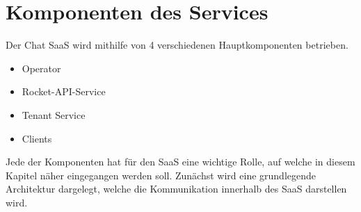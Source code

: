 \chapter{Komponenten des Services}
\label{chap:komponenten}

Der Chat \ac{SaaS} wird mithilfe von 4 verschiedenen Hauptkomponenten betrieben.
\begin{itemize}
  \item Operator
  \item Rocket-API-Service
  \item Tenant Service
  \item Clients
\end{itemize}

Jede der Komponenten hat für den \ac{SaaS} eine wichtige Rolle, auf welche in diesem Kapitel näher eingegangen werden soll.
Zunächst wird eine grundlegende Architektur dargelegt, welche die Kommunikation innerhalb des \ac{SaaS} darstellen wird.
